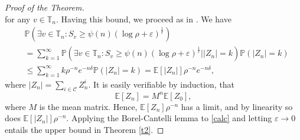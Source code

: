 \documentclass[12pt]{article}
\numberwithin{equation}{section}
\begin{document}
\begin{proof} [Proof of the Theorem]
\begin{equation}
    \end{equation}
    for any $v \in \mathbb{T}_n$.
Having this bound, we proceed as in \cite{Gantert2000}. We have
\begin{equation}\label{calc}
\begin{aligned}
    &\mathbb{P}\left(\exists v \in \mathbb{T}_n : S_v \geq \psi(n) (\log \rho + \varepsilon)^{\frac 1 r}\right) \\ &=\sum_{k=1}^\infty \mathbb{P}\left( \exists v \in \mathbb{T}_n : S_v \geq \psi(n) (\log \rho + \varepsilon)^{\frac 1 r} \Big| |Z_n| = k \right) \mathbb{P} (|Z_n| = k) \\ 
    &\leq \sum_{k=1}^\infty k \rho^{-n} e^{ -n \delta} \mathbb{P} (|Z_n| = k) = 
    \mathbb{E}[|Z_n|] \rho^{-n} e^{ -n \delta},
\end{aligned}
\end{equation}
where $|Z_n| = \sum_{i \in \mathcal{C}} Z^i_n$.
It is easily verifiable by induction, that 
\[
\mathbb{E}[Z_n] = M^n \mathbb{E}[Z_0],
\]
where $M$ is the mean matrix. Hence, $ \mathbb{E}[Z_n] \rho^{-n}$ has a limit, and by linearity so does $\mathbb{E}[|Z_n|] \rho^{-n}$. Applying the Borel-Cantelli lemma to \eqref{calc} and letting $\varepsilon \rightarrow 0$ entails the upper bound in Theorem \ref{t2}.


\end{proof}
\end{document}

